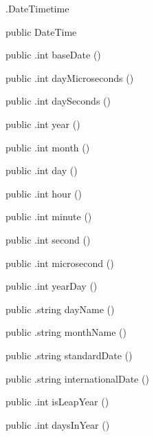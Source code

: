 \begin{CrexxClass}{.DateTime}{time}

  \begin{Hierarchy}
  \end{Hierarchy}

  \begin{Members}

    \Factory
      {public}
      {DateTime}
      {}

    \Method
      {public}
      {.int}
      {baseDate}
      {()}

    \Method
      {public}
      {.int}
      {dayMicroseconds}
      {()}

    \Method
      {public}
      {.int}
      {daySeconds}
      {()}

    \Method
      {public}
      {.int}
      {year}
      {()}

    \Method
      {public}
      {.int}
      {month}
      {()}

    \Method
      {public}
      {.int}
      {day}
      {()}

    \Method
      {public}
      {.int}
      {hour}
      {()}

    \Method
      {public}
      {.int}
      {minute}
      {()}

    \Method
      {public}
      {.int}
      {second}
      {()}

    \Method
      {public}
      {.int}
      {microsecond}
      {()}

    \Method
      {public}
      {.int}
      {yearDay}
      {()}

    \Method
      {public}
      {.string}
      {dayName}
      {()}

    \Method
      {public}
      {.string}
      {monthName}
      {()}

    \Method
      {public}
      {.string}
      {standardDate}
      {()}

    \Method
      {public}
      {.string}
      {internationalDate}
      {()}

    \Method
      {public}
      {.int}
      {isLeapYear}
      {()}

    \Method
      {public}
      {.int}
      {daysInYear}
      {()}


\end{Members}
\end{CrexxClass}
